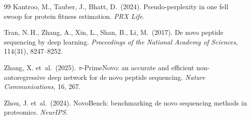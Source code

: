 \documentclass{article}
\begin{document}
{\begin{thebibliography}{99}
Kantroo, M., Tauber, J., Bhatt, D.\ (2024).
Pseudo-perplexity in one fell swoop for protein fitness estimation.
\textit{PRX Life}.

Tran, N.\,H., Zhang, A., Xin, L., Shan, B., Li, M.\ (2017).
De novo peptide sequencing by deep learning.
\textit{Proceedings of the National Academy of Sciences}, 114(31), 8247--8252.

Zhang, X. et~al.\ (2025).
$\pi$-PrimeNovo: an accurate and efficient non-autoregressive deep network
for de novo peptide sequencing.
\textit{Nature Communications}, 16, 267.

Zhou, J. et~al.\ (2024).
NovoBench: benchmarking de novo sequencing methods in proteomics.
\textit{NeurIPS}.

\end{thebibliography}
}
\end{document}
